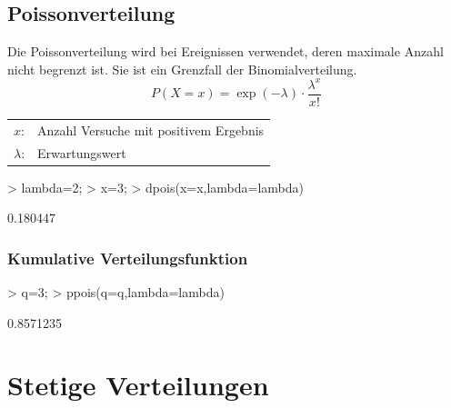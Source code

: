 \subsection{Poissonverteilung}
Die Poissonverteilung wird bei Ereignissen verwendet, deren maximale Anzahl 
nicht begrenzt ist. Sie ist ein Grenzfall der Binomialverteilung. 
\[ P(X=x) = \exp(-\lambda) \cdot \frac{\lambda^x}{x!} \]
\begin{tabular}{@{}ll}
  $x$: & Anzahl Versuche mit positivem Ergebnis \\
  $\lambda$: & Erwartungswert
\end{tabular} 
\begin{Schunk}
\begin{Sinput}
> lambda=2;
> x=3;
> dpois(x=x,lambda=lambda)
\end{Sinput}
\begin{Soutput}
[1] 0.180447
\end{Soutput}
\end{Schunk}

\subsubsection{Kumulative Verteilungsfunktion}
\begin{Schunk}
\begin{Sinput}
> q=3;
> ppois(q=q,lambda=lambda)
\end{Sinput}
\begin{Soutput}
[1] 0.8571235
\end{Soutput}
\end{Schunk}

\section{Stetige Verteilungen}

